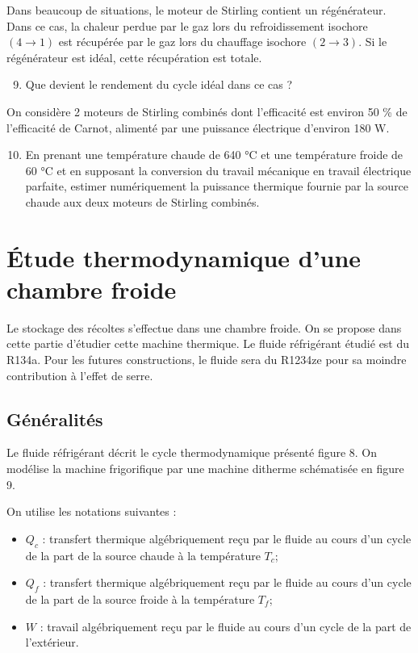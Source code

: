 \documentclass[a4paper, 12pt, garamond]{book}
\begin{document}
Dans beaucoup de situations, le moteur de Stirling contient un
régénérateur. Dans ce cas, la chaleur perdue par le gaz lors du
refroidissement isochore \((4 \to 1)\) est récupérée par le gaz lors du
chauffage isochore \((2 \to 3)\). Si le régénérateur est idéal, cette
récupération est totale.

\begin{enumerate}
	\setcounter{enumi}{8}
	\item
	      Que devient le rendement du cycle idéal dans ce cas ?
\end{enumerate}

On considère 2 moteurs de Stirling combinés dont l'efficacité est
environ 50 \% de l'efficacité de Carnot, alimenté par une puissance
électrique d'environ 180 W.

\begin{enumerate}
	\setcounter{enumi}{9}
	\item
	      En prenant une température chaude de 640 °C et une température froide
	      de 60 °C et en supposant la conversion du travail mécanique en travail
	      électrique parfaite, estimer numériquement la puissance thermique
	      fournie par la source chaude aux deux moteurs de Stirling combinés.
\end{enumerate}

\section{Étude thermodynamique d'une chambre froide}

Le stockage des récoltes s'effectue dans une chambre froide. On se
propose dans cette partie d'étudier cette machine thermique. Le fluide
réfrigérant étudié est du R134a. Pour les futures constructions, le
fluide sera du R1234ze pour sa moindre contribution à l'effet de serre.

\subsection{Généralités}

Le fluide réfrigérant décrit le cycle thermodynamique présenté figure 8.
On modélise la machine frigorifique par une machine ditherme schématisée
en figure 9.

On utilise les notations suivantes :

\begin{itemize}
	\item
	      \(Q_c\) : transfert thermique algébriquement reçu par le fluide au
	      cours d'un cycle de la part de la source chaude à la température
	      \(T_c\);
	\item
	      \(Q_f\) : transfert thermique algébriquement reçu par le fluide au
	      cours d'un cycle de la part de la source froide à la température
	      \(T_f\);
	\item
	      \(W\) : travail algébriquement reçu par le fluide au cours d'un cycle
	      de la part de l'extérieur.
\end{itemize}
\end{document}
